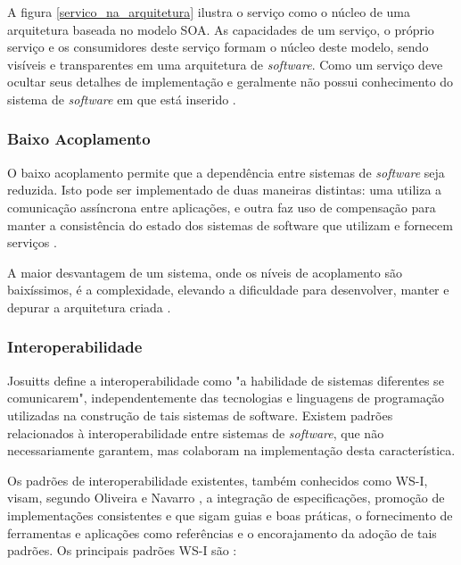 A figura \ref{servico_na_arquitetura} ilustra o serviço como o núcleo de uma arquitetura baseada no modelo SOA. As capacidades de um serviço, o próprio serviço e os consumidores deste serviço formam o núcleo deste modelo, sendo visíveis e transparentes em uma arquitetura de \textit{software}. Como um serviço deve ocultar seus detalhes de implementação e geralmente não possui conhecimento do sistema de \textit{software} em que está inserido \cite{nickull_service_2007}.

\subsubsection{Baixo Acoplamento}
O baixo acoplamento permite que a dependência entre sistemas de \textit{software} seja reduzida. Isto pode ser implementado de duas maneiras distintas: uma utiliza a comunicação assíncrona entre aplicações, e outra faz uso de compensação para manter a consistência do estado dos sistemas de software que utilizam e fornecem serviços \cite{josuttis_soa_2007}.

A maior desvantagem de um sistema, onde os níveis de acoplamento são baixíssimos, é a complexidade, elevando a dificuldade para desenvolver, manter e depurar a arquitetura criada \cite{josuttis_soa_2007}.

\subsubsection{Interoperabilidade}
Josuitts \cite{josuttis_soa_2007} define a interoperabilidade como "a habilidade de sistemas diferentes se comunicarem", independentemente das tecnologias e linguagens de programação utilizadas na construção de tais sistemas de software. Existem padrões relacionados à interoperabilidade entre sistemas de \textit{software}, que não necessariamente garantem, mas colaboram na implementação desta característica. 

Os padrões de interoperabilidade existentes, também conhecidos como WS-I, visam, segundo Oliveira e Navarro \cite{oliveira_interoperabilidade}, a integração de especificações, promoção de implementações consistentes e que sigam guias e boas práticas, o fornecimento de ferramentas e aplicações como referências e o encorajamento da adoção de tais padrões. Os principais padrões WS-I são \cite{oliveira_interoperabilidade}:

